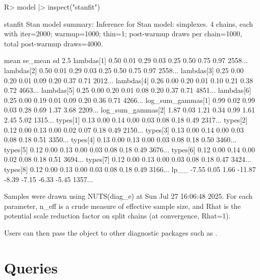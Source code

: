 \documentclass[
  11pt,
  article]{jss}
\renewcommand{\texttt}[1]{\code{#1}}
\begin{document}
\begin{CodeChunk}
\begin{CodeInput}
R> model |> inspect("stanfit")
\end{CodeInput}

\begin{CodeOutput}

stanfit
Stan model summary:
Inference for Stan model: simplexes.
4 chains, each with iter=2000; warmup=1000; thin=1;
post-warmup draws per chain=1000, total post-warmup draws=4000.

                   mean se_mean   sd   2.5%
lambdas[1]         0.50    0.01 0.29   0.03  0.25  0.50  0.75  0.97  2558...
lambdas[2]         0.50    0.01 0.29   0.03  0.25  0.50  0.75  0.97  2558...
lambdas[3]         0.25    0.00 0.20   0.01  0.09  0.20  0.37  0.71  2012...
lambdas[4]         0.26    0.00 0.20   0.01  0.10  0.21  0.38  0.72  4663...
lambdas[5]         0.25    0.00 0.20   0.01  0.08  0.20  0.37  0.71  4851...
lambdas[6]         0.25    0.00 0.19   0.01  0.09  0.20  0.36  0.71  4266...
log_sum_gammas[1]  0.99    0.02 0.99   0.03  0.28  0.69  1.37  3.68  2209...
log_sum_gammas[2]  1.87    0.03 1.21   0.34  0.99  1.61  2.45  5.02  1315...
types[1]           0.13    0.00 0.14   0.00  0.03  0.08  0.18  0.49  2317...
types[2]           0.12    0.00 0.13   0.00  0.02  0.07  0.18  0.49  2150...
types[3]           0.13    0.00 0.14   0.00  0.03  0.08  0.18  0.51  3350...
types[4]           0.13    0.00 0.13   0.00  0.03  0.08  0.18  0.50  3460...
types[5]           0.12    0.00 0.13   0.00  0.03  0.08  0.18  0.49  3676...
types[6]           0.12    0.00 0.14   0.00  0.02  0.08  0.18  0.51  3694...
types[7]           0.12    0.00 0.13   0.00  0.03  0.08  0.18  0.47  3424...
types[8]           0.12    0.00 0.13   0.00  0.03  0.08  0.18  0.49  3166...
lp__              -7.55    0.05 1.66 -11.87 -8.39 -7.15 -6.33 -5.45  1357...

Samples were drawn using NUTS(diag_e) at Sun Jul 27 16:06:48 2025.
For each parameter, n_eff is a crude measure of effective sample size,
and Rhat is the potential scale reduction factor on split chains (at
convergence, Rhat=1).
\end{CodeOutput}
\end{CodeChunk}

Users can then pass the \texttt{stanfit} object to other diagnostic
packages such as \texttt{bayesplot}.

\section{Queries}\label{sec-query}
\end{document}
